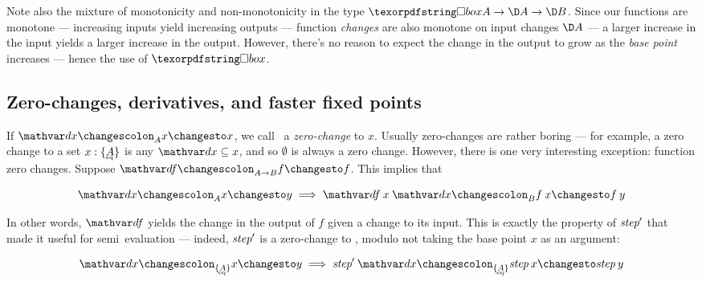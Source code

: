 

Note also the mixture of monotonicity and non-monotonicity in the type $\iso A
\to \D A \to \D B$. Since our functions are monotone --- increasing inputs yield
increasing outputs --- function \emph{changes} are also monotone on input
changes $\D A$ --- a larger increase in the input yields a larger increase in
the output. However, there's no reason to expect the change in the output to
grow as the \emph{base point} increases --- hence the use of $\iso$.


\subsection{Zero-changes, derivatives, and faster fixed points}
\label{sec:derivatives}

If $\changesat A \dx x x$, we call \dx\ a \emph{zero-change} to $x$. Usually
zero-changes are rather boring --- for example, a zero change to a set $x :
\tseteq{A}$ is any $\dx \subseteq x$, and so $\emptyset$ is always a zero
change.
%
However, there is one very interesting exception: function zero changes. Suppose
$\changesat{A \to B}{\df}{f}{f}$. This implies that

\begin{equation}\label{eqn:derivative}
  \changesat A \dx x y \implies \changesat B{\df\<x\<\dx}{f\<x}{f\<y}
\end{equation}

\noindent
In other words, $\df$ yields the change in the output of $f$ given a change to
its input.
%
This is exactly the property of $\text{\itshape step}'$ that made it useful for
semi\naive\ evaluation --- indeed, $\text{\itshape step}'$ is a zero-change to
, modulo not taking the base point $x$ as an argument:

\[ \changesat{\tseteq A} \dx x y \implies
\changesat{\tseteq A}{\name{step}'\<\dx}{\name{step}\<x}{\name{step}\<y}
\]

